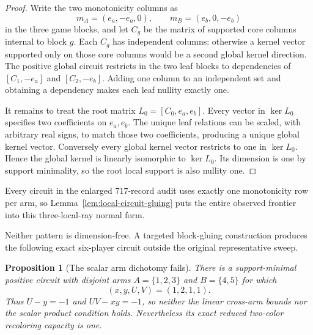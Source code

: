 \documentclass[11pt]{article}
\newtheorem{proposition}[theorem]{Proposition}
\begin{document}
\begin{proof}
Write the two monotonicity columns as
\[
 m_A=(e_a,-e_a,0),\qquad m_B=(e_b,0,-e_b)
\]
in the three game blocks, and let $C_g$ be the matrix of supported core
columns internal to block $g$.  Each $C_g$ has independent columns:
otherwise a kernel vector supported only on those core columns would be a
second global kernel direction.  The positive global circuit restricts in
the two leaf blocks to dependencies of
$[C_1,-e_a]$ and $[C_2,-e_b]$.  Adding one column to an independent set
and obtaining a dependency makes each leaf nullity exactly one.

It remains to treat the root matrix $L_0=[C_0,e_a,e_b]$.  Every vector in
$\ker L_0$ specifies two coefficients on $e_a,e_b$.  The unique leaf
relations can be scaled, with arbitrary real signs, to match those two
coefficients, producing a unique global kernel vector.  Conversely every
global kernel vector restricts to one in $\ker L_0$.  Hence the global
kernel is linearly isomorphic to $\ker L_0$.  Its dimension is one by
support minimality, so the root local support is also nullity one.
\end{proof}

Every circuit in the enlarged $717$-record audit uses exactly one
monotonicity row per arm, so Lemma~\ref{lem:local-circuit-gluing} puts the
entire observed frontier into this three-local-ray normal form.

Neither pattern is dimension-free.  A targeted block-gluing construction
produces the following exact six-player circuit outside the original
representative sweep.

\begin{proposition}[The scalar arm dichotomy fails]\label{prop:forbidden-ratio}
There is a support-minimal positive circuit with disjoint arms
$A=\{1,2,3\}$ and $B=\{4,5\}$ for which
\[
 (x,y,U,V)=(1,2,1,1).
\]
Thus $U-y=-1$ and $UV-xy=-1$, so neither the linear cross-arm bounds nor the
scalar product condition holds.  Nevertheless its exact reduced two-color
recoloring capacity is one.
\end{proposition}
\end{document}
